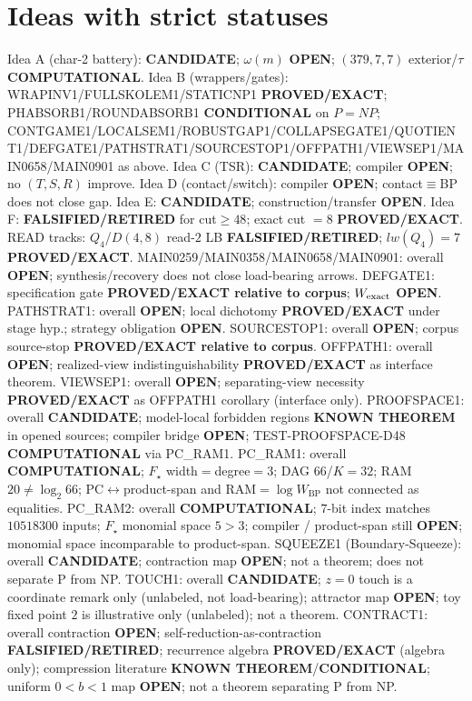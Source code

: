 \documentclass[11pt]{article}
\begin{document}
\section*{Ideas with strict statuses}
Idea A (char-2 battery): \textbf{CANDIDATE}; $\omega(m)$ \textbf{OPEN}; $(379,7,7)$ exterior/$\tau$ \textbf{COMPUTATIONAL}.
Idea B (wrappers/gates): WRAPINV1/FULLSKOLEM1/STATICNP1 \textbf{PROVED/EXACT};
PHABSORB1/ROUNDABSORB1 \textbf{CONDITIONAL} on $P=NP$;
CONTGAME1/LOCALSEM1/ROBUSTGAP1/COLLAPSEGATE1/QUOTIENT1/DEFGATE1/PATHSTRAT1/SOURCESTOP1/OFFPATH1/VIEWSEP1/MAIN0658/MAIN0901 as above.
Idea C (TSR): \textbf{CANDIDATE}; compiler \textbf{OPEN}; no $(T,S,R)$ improve.
Idea D (contact/switch): compiler \textbf{OPEN}; contact$\equiv$BP does not close gap.
Idea E: \textbf{CANDIDATE}; construction/transfer \textbf{OPEN}.
Idea F: \textbf{FALSIFIED/RETIRED} for cut$\ge48$; exact cut $=8$ \textbf{PROVED/EXACT}.
READ tracks: $Q_4$/$D(4,8)$ read-$2$ LB \textbf{FALSIFIED/RETIRED}; $lw(Q_4)=7$ \textbf{PROVED/EXACT}.
MAIN0259/MAIN0358/MAIN0658/MAIN0901: overall \textbf{OPEN}; synthesis/recovery does not close load-bearing arrows.
DEFGATE1: specification gate \textbf{PROVED/EXACT relative to corpus}; $W_{\rm exact}$ \textbf{OPEN}.
PATHSTRAT1: overall \textbf{OPEN}; local dichotomy \textbf{PROVED/EXACT} under stage hyp.; strategy obligation \textbf{OPEN}.
SOURCESTOP1: overall \textbf{OPEN}; corpus source-stop \textbf{PROVED/EXACT relative to corpus}.
OFFPATH1: overall \textbf{OPEN}; realized-view indistinguishability \textbf{PROVED/EXACT} as interface theorem.
VIEWSEP1: overall \textbf{OPEN}; separating-view necessity \textbf{PROVED/EXACT} as OFFPATH1 corollary (interface only).
PROOFSPACE1: overall \textbf{CANDIDATE}; model-local forbidden regions \textbf{KNOWN THEOREM} in opened sources;
compiler bridge \textbf{OPEN}; TEST-PROOFSPACE-D48 \textbf{COMPUTATIONAL} via PC\_RAM1.
PC\_RAM1: overall \textbf{COMPUTATIONAL}; $F_\star$ width$=$degree$=3$; DAG $66$/$K{=}32$; RAM $20\neq\log_2 66$;
PC$\leftrightarrow$product-span and RAM$=\log W_{\mathrm{BP}}$ not connected as equalities.
PC\_RAM2: overall \textbf{COMPUTATIONAL}; $7$-bit index matches $10518300$ inputs; $F_\star$ monomial space $5{>}3$;
compiler / product-span still \textbf{OPEN}; monomial space incomparable to product-span.
SQUEEZE1 (Boundary-Squeeze): overall \textbf{CANDIDATE}; contraction map \textbf{OPEN}; not a theorem;
does not separate P from NP.
TOUCH1: overall \textbf{CANDIDATE}; $z{=}0$ touch is a coordinate remark only (unlabeled, not load-bearing); attractor map \textbf{OPEN}; toy fixed point $2$ is illustrative only (unlabeled); not a theorem.
CONTRACT1: overall contraction \textbf{OPEN}; self-reduction-as-contraction \textbf{FALSIFIED/RETIRED};
recurrence algebra \textbf{PROVED/EXACT} (algebra only); compression literature \textbf{KNOWN THEOREM}/\textbf{CONDITIONAL};
uniform $0{<}b{<}1$ map \textbf{OPEN}; not a theorem separating P from NP.
\end{document}
